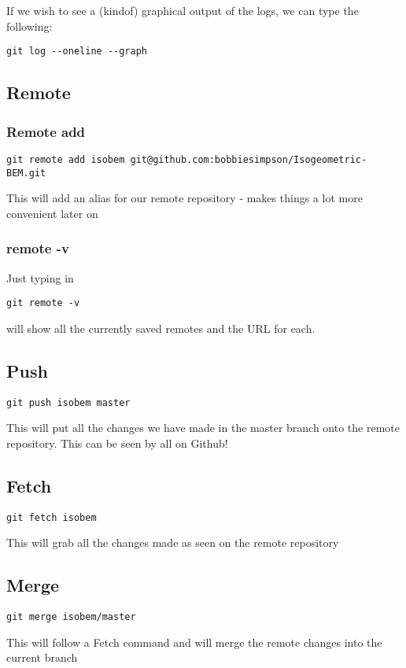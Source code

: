 \documentclass[a4paper, 10pt]{article}
\begin{document}
If we wish to see a (kindof) graphical output of the logs, we can type
the following:
\begin{verbatim}
git log --oneline --graph
\end{verbatim}

\subsection*{Remote}

\subsubsection*{Remote add}

\begin{Verbatim}
git remote add isobem git@github.com:bobbiesimpson/Isogeometric-BEM.git
\end{Verbatim}
This will add an alias for our remote repository - makes things a lot more convenient later on

\subsubsection*{remote -v}
\label{sec:remote-v}

Just typing in 
\begin{verbatim}
git remote -v
\end{verbatim}
will show all the currently saved remotes and the URL for each.

\subsection*{Push}
\begin{Verbatim}
git push isobem master
\end{Verbatim}
This will put all the changes we have made in the master branch onto the remote repository. This can be seen by all on Github!


\subsection*{Fetch}
\begin{Verbatim}
git fetch isobem 
\end{Verbatim}
This will grab all the changes made as seen on the remote repository

\subsection*{Merge}
\begin{Verbatim}
git merge isobem/master
\end{Verbatim}
This will follow a Fetch command and will merge the remote changes
into the current branch
\end{document}

